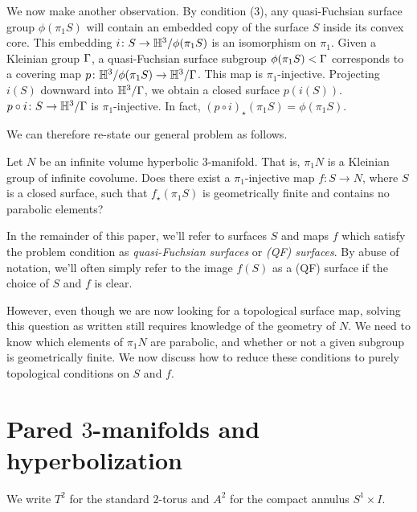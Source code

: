 We now make another observation. By condition (3), any quasi-Fuchsian surface
group $\phi(\pi_1S)$ will contain an embedded copy of the surface $S$ inside
its convex core.  This embedding $i \colon S \to \mathbb{H}^3/\phi(\pi_1S)$ is an
isomorphism on $\pi_1$.  Given a Kleinian group $\Gamma$, a quasi-Fuchsian surface
subgroup $\phi(\pi_1S) < \Gamma$ corresponds to a covering map $p \colon
\mathbb{H}^3/\phi(\pi_1S) \to \mathbb{H}^3/\Gamma$. This map is $\pi_1$-injective.  Projecting
$i(S)$ downward into $\mathbb{H}^3/\Gamma$, we obtain a closed surface $p(i(S))$. $p
\circ i \colon S \to \mathbb{H}^3/\Gamma$ is $\pi_1$-injective. In fact, $(p \circ
i)_\star(\pi_1S) = \phi(\pi_1S)$.

We can therefore re-state our general problem as follows.

\begin{prob}

Let $N$ be an infinite volume hyperbolic $3$-manifold. That is, $\pi_1N$ is
a Kleinian group of infinite covolume. Does there exist a $\pi_1$-injective map
$f \colon S \to N$, where $S$ is a closed surface, such that $f_\star(\pi_1S)$
is geometrically finite and contains no parabolic elements?

\end{prob}

In the remainder of this paper, we'll refer to surfaces $S$ and maps $f$ which
satisfy the problem condition as \emph{quasi-Fuchsian surfaces} or \emph{(QF)
surfaces}. By abuse of notation, we'll often simply refer to the image $f(S)$
as a (QF) surface if the choice of $S$ and $f$ is clear.

However, even though we are now looking for a topological surface map, solving
this question as written still requires knowledge of the geometry of $N$. We
need to know which elements of $\pi_1N$ are parabolic, and whether or not
a given subgroup is geometrically finite. We now discuss how to reduce these
conditions to purely topological conditions on $S$ and $f$.

\section{Pared \texorpdfstring{$3$}{3}-manifolds and hyperbolization}

\begin{ntn}

We write $T^2$ for the standard $2$-torus and $A^2$ for the compact annulus
$S^1 \times I$.

\end{ntn}

